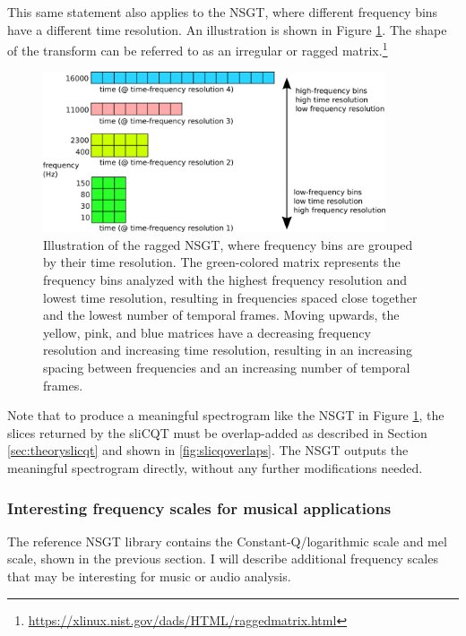 \documentclass[report.tex]{subfiles}
\begin{document}
This same statement also applies to the NSGT, where different frequency bins have a different time resolution. An illustration is shown in Figure \ref{fig:raggedslicqt}. The shape of the transform can be referred to as an irregular or ragged matrix.\footnote{\url{https://xlinux.nist.gov/dads/HTML/raggedmatrix.html}}

\begin{figure}[ht]
	\centering
	\includegraphics[width=0.9\textwidth]{./images-misc/slicq_shape.png}
	\caption{Illustration of the ragged NSGT, where frequency bins are grouped by their time resolution. The green-colored matrix represents the frequency bins analyzed with the highest frequency resolution and lowest time resolution, resulting in frequencies spaced close together and the lowest number of temporal frames. Moving upwards, the yellow, pink, and blue matrices have a decreasing frequency resolution and increasing time resolution, resulting in an increasing spacing between frequencies and an increasing number of temporal frames.}
	\label{fig:raggedslicqt}
\end{figure}

Note that to produce a meaningful spectrogram like the NSGT in Figure \ref{fig:raggedslicqt}, the slices returned by the sliCQT must be overlap-added as described in Section \ref{sec:theoryslicqt} and shown in \ref{fig:slicqoverlaps}. The NSGT outputs the meaningful spectrogram directly, without any further modifications needed.

\newpagefill

\subsubsection{Interesting frequency scales for musical applications}
\label{sec:fscales}

The reference NSGT library contains the Constant-Q/logarithmic scale and mel scale, shown in the previous section. I will describe additional frequency scales that may be interesting for music or audio analysis.
\end{document}
